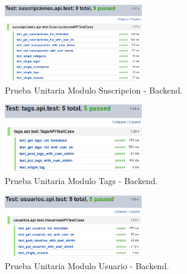 \documentclass[12pt,letterpaper,openany]{book}
\begin{document}
\begin{figure}[H]
\begin{center}
\includegraphics[width=6cm]{./imagenes/Test/Backend/Test__suscripciones_api_test}
\caption{Prueba Unitaria Modulo Suscripcion - Backend.}
\end{center}
\end{figure}

\begin{figure}[H]
\begin{center}
\includegraphics[width=6cm]{./imagenes/Test/Backend/Test__tags_api_test}
\caption{Prueba Unitaria Modulo Tags - Backend.}
\end{center}
\end{figure}

\begin{figure}[H]
\begin{center}
\includegraphics[width=6cm]{./imagenes/Test/Backend/Test__usuarios_api_test}
\caption{Prueba Unitaria Modulo Usuario - Backend.}
\end{center}
\end{figure}
\end{document}
